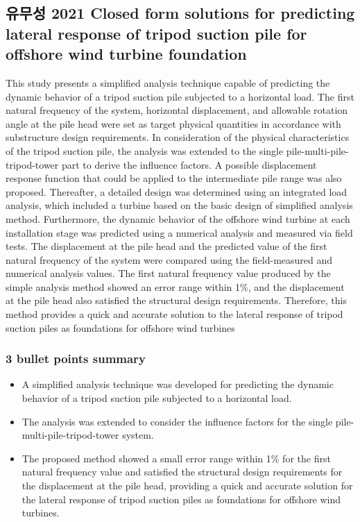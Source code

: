 \documentclass[
  letterpaper,
  DIV=11,
  numbers=noendperiod]{scrreprt}
\providecommand{\tightlist}{%
  \setlength{\itemsep}{0pt}\setlength{\parskip}{0pt}}\usepackage{longtable,booktabs,array}
\begin{document}
\hypertarget{uxc720uxbb34uxc131-2021-closed-form-solutions-for-predicting-lateral-response-of-tripod-suction-pile-for-offshore-wind-turbine-foundation}{%
\subsection{유무성 2021 Closed form solutions for predicting lateral
response of tripod suction pile for offshore wind turbine
foundation}\label{uxc720uxbb34uxc131-2021-closed-form-solutions-for-predicting-lateral-response-of-tripod-suction-pile-for-offshore-wind-turbine-foundation}}

This study presents a simplified analysis technique capable of
predicting the dynamic behavior of a tripod suction pile subjected to a
horizontal load. The first natural frequency of the system, horizontal
displacement, and allowable rotation angle at the pile head were set as
target physical quantities in accordance with substructure design
requirements. In consideration of the physical characteristics of the
tripod suction pile, the analysis was extended to the single
pile-multi-pile-tripod-tower part to derive the influence factors. A
possible displacement response function that could be applied to the
intermediate pile range was also proposed. Thereafter, a detailed design
was determined using an integrated load analysis, which included a
turbine based on the basic design of simplified analysis method.
Furthermore, the dynamic behavior of the offshore wind turbine at each
installation stage was predicted using a numerical analysis and measured
via field tests. The displacement at the pile head and the predicted
value of the first natural frequency of the system were compared using
the field-measured and numerical analysis values. The first natural
frequency value produced by the simple analysis method showed an error
range within 1\%, and the displacement at the pile head also satisfied
the structural design requirements. Therefore, this method provides a
quick and accurate solution to the lateral response of tripod suction
piles as foundations for offshore wind turbines

\hypertarget{bullet-points-summary-10}{%
\subsubsection{3 bullet points summary}\label{bullet-points-summary-10}}

\begin{itemize}
\tightlist
\item
  A simplified analysis technique was developed for predicting the
  dynamic behavior of a tripod suction pile subjected to a horizontal
  load.
\item
  The analysis was extended to consider the influence factors for the
  single pile-multi-pile-tripod-tower system.
\item
  The proposed method showed a small error range within 1\% for the
  first natural frequency value and satisfied the structural design
  requirements for the displacement at the pile head, providing a quick
  and accurate solution for the lateral response of tripod suction piles
  as foundations for offshore wind turbines.
\end{itemize}
\end{document}
